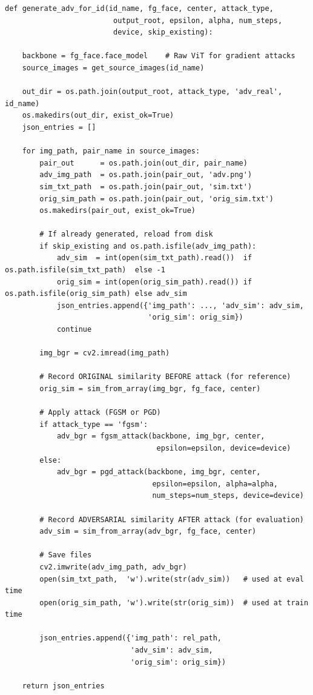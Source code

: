 \documentclass[12pt,a4paper]{article}
\begin{document}
\begin{lstlisting}[caption={generate\_adversarial\_dataset.py -- Core generation function}]
def generate_adv_for_id(id_name, fg_face, center, attack_type,
                         output_root, epsilon, alpha, num_steps,
                         device, skip_existing):

    backbone = fg_face.face_model    # Raw ViT for gradient attacks
    source_images = get_source_images(id_name)

    out_dir = os.path.join(output_root, attack_type, 'adv_real', id_name)
    os.makedirs(out_dir, exist_ok=True)
    json_entries = []

    for img_path, pair_name in source_images:
        pair_out      = os.path.join(out_dir, pair_name)
        adv_img_path  = os.path.join(pair_out, 'adv.png')
        sim_txt_path  = os.path.join(pair_out, 'sim.txt')
        orig_sim_path = os.path.join(pair_out, 'orig_sim.txt')
        os.makedirs(pair_out, exist_ok=True)

        # If already generated, reload from disk
        if skip_existing and os.path.isfile(adv_img_path):
            adv_sim  = int(open(sim_txt_path).read())  if os.path.isfile(sim_txt_path)  else -1
            orig_sim = int(open(orig_sim_path).read()) if os.path.isfile(orig_sim_path) else adv_sim
            json_entries.append({'img_path': ..., 'adv_sim': adv_sim,
                                 'orig_sim': orig_sim})
            continue

        img_bgr = cv2.imread(img_path)

        # Record ORIGINAL similarity BEFORE attack (for reference)
        orig_sim = sim_from_array(img_bgr, fg_face, center)

        # Apply attack (FGSM or PGD)
        if attack_type == 'fgsm':
            adv_bgr = fgsm_attack(backbone, img_bgr, center,
                                   epsilon=epsilon, device=device)
        else:
            adv_bgr = pgd_attack(backbone, img_bgr, center,
                                  epsilon=epsilon, alpha=alpha,
                                  num_steps=num_steps, device=device)

        # Record ADVERSARIAL similarity AFTER attack (for evaluation)
        adv_sim = sim_from_array(adv_bgr, fg_face, center)

        # Save files
        cv2.imwrite(adv_img_path, adv_bgr)
        open(sim_txt_path,  'w').write(str(adv_sim))   # used at eval time
        open(orig_sim_path, 'w').write(str(orig_sim))  # used at train time

        json_entries.append({'img_path': rel_path,
                             'adv_sim': adv_sim,
                             'orig_sim': orig_sim})

    return json_entries
\end{lstlisting}
\end{document}
